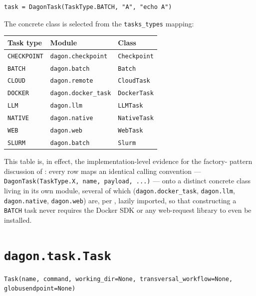 \begin{lstlisting}
task = DagonTask(TaskType.BATCH, "A", "echo A")
\end{lstlisting}

The concrete class is selected from the \texttt{tasks\_types} mapping:

\begin{center}
\begin{tabular}{@{}lll@{}}
\toprule
\textbf{Task type} & \textbf{Module} & \textbf{Class} \\
\midrule
\texttt{CHECKPOINT} & \texttt{dagon.checkpoint} & \texttt{Checkpoint} \\
\texttt{BATCH}       & \texttt{dagon.batch} & \texttt{Batch} \\
\texttt{CLOUD}       & \texttt{dagon.remote} & \texttt{CloudTask} \\
\texttt{DOCKER}      & \texttt{dagon.docker\_task} & \texttt{DockerTask} \\
\texttt{LLM}         & \texttt{dagon.llm} & \texttt{LLMTask} \\
\texttt{NATIVE}      & \texttt{dagon.native} & \texttt{NativeTask} \\
\texttt{WEB}         & \texttt{dagon.web} & \texttt{WebTask} \\
\texttt{SLURM}       & \texttt{dagon.batch} & \texttt{Slurm} \\
\bottomrule
\end{tabular}
\end{center}

This table is, in effect, the implementation-level evidence for the factory-
pattern discussion of : every row maps an
identical calling convention --- \texttt{DagonTask(TaskType.X, name,
payload, ...)} --- onto a distinct concrete class living in its own module,
several of which (\texttt{dagon.docker\_task}, \texttt{dagon.llm},
\texttt{dagon.native}, \texttt{dagon.web}) are, per
, lazily imported, so that constructing a
\texttt{BATCH} task never requires the Docker SDK or any web-request library
to even be installed.

\section{\texttt{dagon.task.Task}}

\begin{lstlisting}[caption={Base constructor.}]
Task(name, command, working_dir=None, transversal_workflow=None, globusendpoint=None)
\end{lstlisting}


